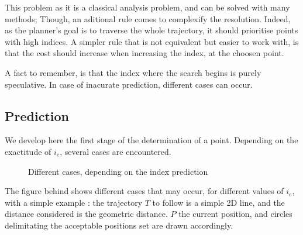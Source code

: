 This problem as it is a classical analysis problem, and can be solved with many methods;
Though, an aditional rule comes to complexify the resolution. 
Indeed, as the planner's goal is to traverse the whole trajectory, it should prioritise points with high
indices. A simpler rule that is not equivalent but easier to work with, is that the cost should increase 
when increasing the index, at the choosen point.
\newline

A fact to remember, is that the index where the search begins is purely speculative. In case of inacurate 
prediction, different cases can occur.

\newpage

\subsection{Prediction}

We develop here the first stage of the determination of a point. Depending on the exactitude of $i_e$, several
cases are encountered.

\begin{figure}[!h]
\caption{Different cases, depending on the index prediction}
\end{figure}

The figure behind shows different cases that may occur, for different values of $i_e$, with a simple example :
the trajectory $T$ to follow is a simple 2D line, and the distance considered is the geometric distance.
$P$ the current position, and circles delimitating the acceptable positions set are drawn accordingly.

